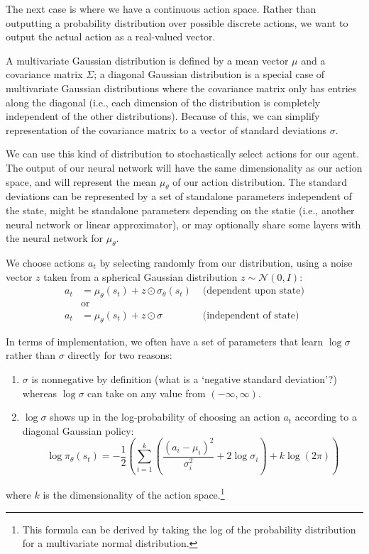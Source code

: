\documentclass[journal, onecolumn, 12pt, draftclsnofoot]{IEEEtran}
\newcommand{\mc}[1]{\mathcal{#1}}
\begin{document}
		\par The next case is where we have a continuous action space. Rather than outputting a probability distribution over possible discrete actions, we want to output the actual action as a real-valued vector.
		\par A multivariate Gaussian distribution is defined by a mean vector $\mu$ and a covariance matrix $\Sigma$; a diagonal Gaussian distribution is a special case of multivariate Gaussian distributions where the covariance matrix only has entries along the diagonal (i.e., each dimension of the distribution is completely independent of the other distributions). Because of this, we can simplify representation of the covariance matrix to a vector of standard deviations $\sigma$.
		\par We can use this kind of distribution to stochastically select actions for our agent. The output of our neural network will have the same dimensionality as our action space, and will represent the mean $\mu_\theta$ of our action distribution. The standard deviations can be represented by a set of standalone parameters independent of the state, might be standalone parameters depending on the statie (i.e., another neural network or linear approximator), or may optionally share some layers with the neural network for $\mu_\theta$.
		\par We choose actions $a_t$ by selecting randomly from our distribution, using a noise vector $z$ taken from a spherical Gaussian distribution $z \sim \mc{N}(0,I)$:
		\begin{align}
			\label{eqn:action-from-diagonal-Gaussian-policy}
			a_t &= \mu_\theta(s_t) + z \odot \sigma_\theta(s_t) &\text{ (dependent upon state)} \\
			&\text{or} \\
			a_t &= \mu_\theta(s_t) + z \odot \sigma &\text{ (independent of state)}  \nonumber
		\end{align}
		\par In terms of implementation, we often have a set of parameters that learn $\log \sigma$ rather than $\sigma$ directly for two reasons:
		\begin{enumerate}
			\item $\sigma$ is nonnegative by definition (what is a `negative standard deviation'?) whereas $\log \sigma$ can take on any value from $(-\infty, \infty)$.
			\item $\log \sigma$ shows up in the log-probability of choosing an action $a_t$ according to a diagonal Gaussian policy:
			\begin{equation}
				\label{eqn:log-prob-diagonal-Gaussian}
				\log \pi_\theta(s_t) = -\frac{1}{2} \left( \sum_{i=1}^k \left(  \frac{(a_i - \mu_i)^2}{\sigma_i^2} + 2 \log \sigma_i \right) + k \log(2 \pi)\right)
			\end{equation}
		\end{enumerate}
		where $k$ is the dimensionality of the action space.\footnote{This formula can be derived by taking the log of the probability distribution for a multivariate normal distribution.}
\end{document}
